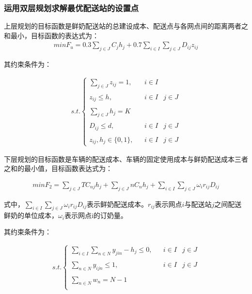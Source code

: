 \documentclass[withoutpreface,bwprint]{cumcmthesis} %
\begin{document}
 \subsubsection{运用双层规划求解最优配送站的设置点}
上层规划的目标函数是鲜奶配送站的总建设成本、配送点与各网点间的距离两者之和最小，目标函数的表达式为：
\begin{align*}
	min{{F}_{u}}=0.3\sum_{j\in J}^{}{{{C}_{j}}}{{h}_{j}}+0.7\sum_{i\in I}^{}{\sum_{j\in J}^{}{{{D}_{ij}}}}{{z}_{ij}}
\end{align*}

其约束条件为：

\begin{align*}
	s.t.\left \{{\begin{matrix}\sum_{j\in J}^{}{{{z}_{ij}}}=1,&&i\in I&\\&&&\\{{z}_{ij}}\le h,&&i\in I&j\in J\\&&&\\\sum_{j\in J}^{}{{{h}_{j}}=K}&&&\\&&&\\{{D}_{ij}}\le d,&&i\in I&j\in J\\&&&\\{{z}_{ij}},{{h}_{j}}\in \{0,1\},&&i\in I&j\in J\end{matrix}}\right .
\end{align*}

下层规划的目标函数是车辆的配送成本、车辆的固定使用成本与鲜奶配送成本三者之和的最小值，目标函数表达式为：

\begin{align*}
	min{{F}_{2}}=\sum_{j\in J}^{}{T{{C}_{nj}}}{{h}_{j}}+\sum_{j\in J}^{}{n{{C}_{n}}}{{h}_{j}}+\sum_{i\in I}^{}{\sum_{j\in J}^{}{{\omega_{i}}}}{{r}_{ij}}{{D}_{ij}}
\end{align*}

式中，$\sum_{i\in I}^{}{\sum_{j\in J}^{}{{{ω}_{i}}}}{{r}_{ij}}{{D}_{ij}}$表示鲜奶配送成本。${{r}_{ij}}$表示网点$i$与配送站$j$之间配送鲜奶的单位成本，$\omega_{i}$表示网点i的订奶量。

其约束条件为：

\begin{align*}
s.t.\left \{{\begin{matrix}\sum_{i\in I}^{}{\sum_{n\in N}^{}{{{y}_{jin}}}}-{{h}_{j}}\le 0,&&i\in I&j\in J\\&&&\\\sum_{n\in N}^{}{{{y}_{ijn}}}\le 1,&&i\in I&j\in J\\&&&\\\sum_{n\in N}^{}{{{w}_{n}}}=N-1&&&\\&&&\end{matrix}}\right .
\end{align*}
\end{document}

